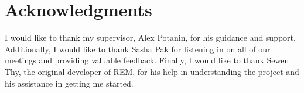 \section*{Acknowledgments}

I would like to thank my supervisor, Alex Potanin, for his guidance and support.
Additionally, I would like to thank Sasha Pak for listening in on all of our
meetings and providing valuable feedback. Finally, I would like to thank Sewen
Thy, the original developer of REM, for his help in understanding the project
and his assistance in getting me started.